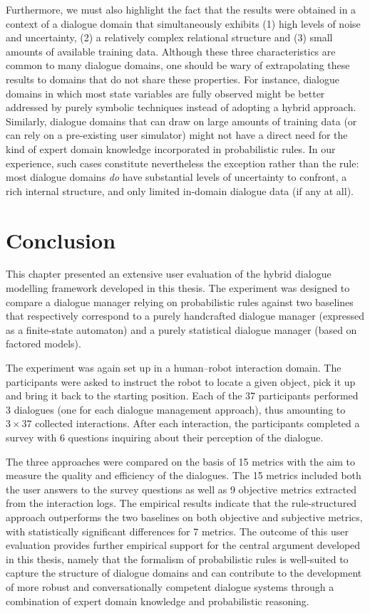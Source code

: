 Furthermore, we must also highlight the fact that the results were obtained in a context of a dialogue domain that simultaneously exhibits (1) high levels of noise and uncertainty, (2) a relatively complex relational structure and (3) small amounts of available training data.  Although these three characteristics are common to many  dialogue domains, one should be wary of extrapolating these results to domains that do not share these properties.  For instance, dialogue domains in which most state variables are fully observed might be better addressed by purely symbolic techniques instead of adopting a hybrid approach. Similarly, dialogue domains that can draw on large amounts of training data (or can rely on a pre-existing user simulator) might not have a direct need for the kind of expert domain knowledge incorporated in probabilistic rules.   In our experience, such cases constitute nevertheless the exception rather than the rule: most dialogue domains \textit{do} have substantial levels of uncertainty to confront, a rich internal structure, and only limited in-domain dialogue data (if any at all).


\section{Conclusion}

This chapter presented an extensive user evaluation of the hybrid dialogue modelling framework developed in this thesis.  The experiment was designed to compare a dialogue manager relying on probabilistic rules against two baselines that respectively correspond to a purely handcrafted dialogue manager (expressed as a finite-state automaton) and a purely statistical dialogue manager (based on factored models). 

The experiment was again set up in a human--robot interaction domain.  The participants were asked to instruct the robot to locate a given object, pick it up and bring it back to the starting position.  Each of the 37 participants performed 3 dialogues (one for each dialogue management approach), thus amounting to $3 \times 37$ collected interactions.  After each interaction, the participants completed a survey with 6 questions inquiring about their perception of the dialogue.  

The three approaches were compared on the basis of 15 metrics with the aim to measure the quality and efficiency of the dialogues. The 15 metrics included both the user answers to the survey questions as well as 9 objective metrics extracted from the interaction logs.   The empirical results indicate that the rule-structured approach outperforms the two baselines on both objective and subjective metrics, with statistically significant differences for 7 metrics. The outcome of this user evaluation provides further empirical support for the central argument developed in this thesis, namely that the formalism of probabilistic rules is well-suited to capture the structure of dialogue domains and can contribute to the development of more robust and conversationally competent dialogue systems through a combination of expert domain knowledge and probabilistic reasoning. 


